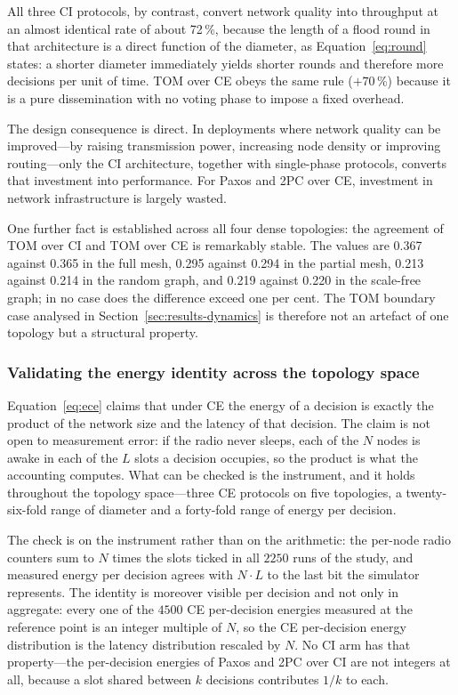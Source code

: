 \documentclass[journal]{IEEEtran}
\newcommand{\CI}{CI}                      %
\newcommand{\CE}{CE}                      %
\newcommand{\Nnodes}{N}                   %
\begin{document}
All three \CI{} protocols, by contrast, convert network quality into
throughput at an almost identical rate of about 72\,\%, because the length
of a flood round in that architecture is a direct function of the
diameter, as Equation~\eqref{eq:round} states: a shorter diameter
immediately yields shorter rounds and therefore more decisions per unit of
time. TOM over \CE{} obeys the same rule ($+70$\,\%) because it is a pure
dissemination with no voting phase to impose a fixed overhead.

The design consequence is direct. In deployments where network quality can
be improved---by raising transmission power, increasing node density or
improving routing---only the \CI{} architecture, together with
single-phase protocols, converts that investment into performance. For
Paxos and 2PC over \CE, investment in network infrastructure is largely
wasted.

One further fact is established across all four dense topologies: the
agreement of TOM over \CI{} and TOM over \CE{} is remarkably stable. The
values are 0.367 against 0.365 in the full mesh, 0.295 against 0.294 in
the partial mesh, 0.213 against 0.214 in the random graph, and 0.219
against 0.220 in the scale-free graph; in no case does the difference
exceed one per cent. The TOM boundary case analysed in
Section~\ref{sec:results-dynamics} is therefore not an artefact of one
topology but a structural property.

\subsubsection{Validating the energy identity across the topology space}


Equation~\eqref{eq:ece} claims that under \CE{} the energy of a decision
is exactly the product of the network size and the latency of that
decision. The claim is not open to measurement error: if the radio never
sleeps, each of the $\Nnodes$ nodes is awake in each of the $L$ slots a
decision occupies, so the product is what the accounting computes. What can be
checked is the instrument, and it holds throughout the topology space---three
\CE{} protocols on five topologies, a twenty-six-fold range of diameter and a
forty-fold range of energy per decision.

The check is on the instrument rather than on the arithmetic: the per-node
radio counters sum to $\Nnodes$ times the slots ticked in all $2250$ runs of
the study, and measured energy per decision agrees with $\Nnodes \cdot L$ to
the last bit the simulator represents. The identity is moreover visible per
decision and not only in aggregate: every one of the $4500$ \CE{} per-decision
energies measured at the reference point is an integer multiple of $\Nnodes$,
so the \CE{} per-decision energy distribution is the latency distribution
rescaled by $\Nnodes$. No \CI{} arm has that property---the per-decision
energies of Paxos and 2PC over \CI{} are not integers at all, because a slot
shared between $k$ decisions contributes $1/k$ to each.
\end{document}

